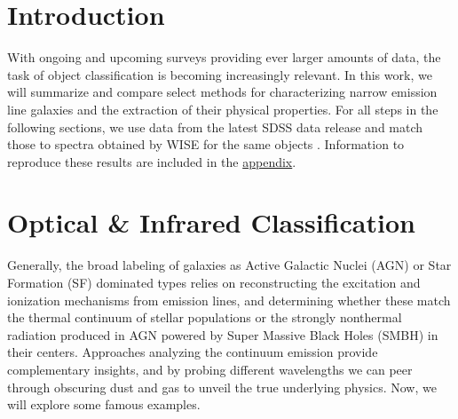	
	\section{Introduction}

	With ongoing and upcoming surveys providing ever larger amounts of data, the task of object classification is
	becoming increasingly relevant. In this work, we will summarize and compare select methods for characterizing
	narrow emission line galaxies and the extraction of their physical properties. For all steps in the following
	sections, we use data from the latest SDSS data release and match those to spectra obtained by WISE for the
	same objects \cite{wrig2010, koll2026}. Information to reproduce these results are included in the \hyperref[sec:appendix]{appendix}.

	\section{Optical \& Infrared Classification}

	Generally, the broad labeling of galaxies as Active Galactic Nuclei (AGN) or Star Formation (SF) dominated types
	relies on reconstructing the excitation and ionization mechanisms from emission lines, and determining whether
	these match the thermal continuum of stellar populations or the strongly nonthermal radiation produced in AGN
	powered by Super Massive Black Holes (SMBH) in their centers. Approaches analyzing the continuum emission provide
	complementary insights, and by probing different wavelengths we can peer through obscuring dust and gas to unveil
	the true underlying physics. Now, we will explore some famous examples.


